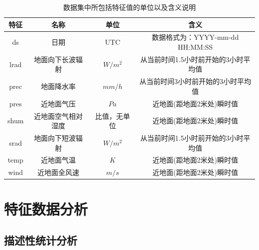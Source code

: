 \documentclass[AutoFakeBold]{LZUThesis}
\begin{document}
\begin{table}[H]
    \centering
    \caption{数据集中所包括特征值的单位以及含义说明}
    \begin{tabular}{cccc}
    \toprule
    特征 & 名称 & 单位 & 含义 \\
    \midrule
    ds & 日期 & UTC & 数据格式为：YYYY-mm-dd HH:MM:SS \\
    lrad & 地面向下长波辐射 & $W/m^2$ & 从当前时间1.5小时前开始的3小时平均值 \\
    prec & 地面降水率 & $mm/h$ & 从当前时间3小时前开始的3小时平均值 \\
    pres & 近地面气压 & $Pa$ & 近地面(距地面2米处)瞬时值 \\
    shum & 近地面空气相对湿度 & 比值，无单位 & 近地面(距地面2米处)瞬时值 \\
    srad & 地面向下短波辐射 & $W/m^2$ & 从当前时间1.5小时前开始的3小时平均值 \\
    temp & 近地面气温 & $K$ & 近地面(距地面2米处)瞬时值 \\
    wind & 近地面全风速 & $m/s$ & 近地面(距地面2米处)瞬时值 \\
    \bottomrule
    \end{tabular}
    \label{features}
\end{table}

\section{特征数据分析}
\subsection{描述性统计分析}
\end{document}
